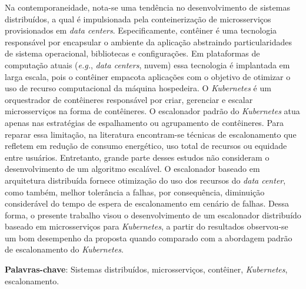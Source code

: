 \setlength{\absparsep}{18pt} %
\begin{resumo}
    Na contemporaneidade, nota-se uma tendência no desenvolvimento de sistemas distribuídos, a qual é impulsionada pela conteinerização de microsserviços provisionados em \textit{data centers}. Especificamente, contêiner é uma tecnologia responsável por encapsular o ambiente da aplicação abstraindo particularidades de sistema operacional, bibliotecas e configurações. Em plataformas de computação atuais (\textit{e.g.}, \textit{data centers}, nuvem) essa tecnologia é implantada em larga escala, pois o contêiner empacota aplicações com o objetivo de otimizar o uso de recurso computacional da máquina hospedeira. O \textit{Kubernetes} é um orquestrador de contêineres responsável por criar, gerenciar e escalar microsserviços na forma de contêineres. O escalonador padrão do \textit{Kubernetes} atua apenas nas estratégias de espalhamento ou agrupamento de contêineres. Para reparar essa limitação, na literatura encontram-se técnicas de escalonamento que refletem em redução de consumo energético, uso total de recursos ou equidade entre usuários. Entretanto, grande parte desses estudos não consideram o desenvolvimento de um algoritmo escalável. O escalonador baseado em arquitetura distribuída fornece otimização do uso dos recursos do \textit{data center}, como também, melhor tolerância a falhas, por consequência, diminuição considerável do tempo de espera de escalonamento em cenário de falhas. Dessa forma, o presente trabalho visou o desenvolvimento de um escalonador distribuído baseado em microsserviços para \textit{Kubernetes}, a partir do resultados observou-se um bom desempenho da proposta quando comparado com a abordagem padrão de escalonamento do \textit{Kubernetes}.
    
    \textbf{Palavras-chave}: Sistemas distribuídos, microsserviços, contêiner, \textit{Kubernetes}, escalonamento.
\end{resumo}

